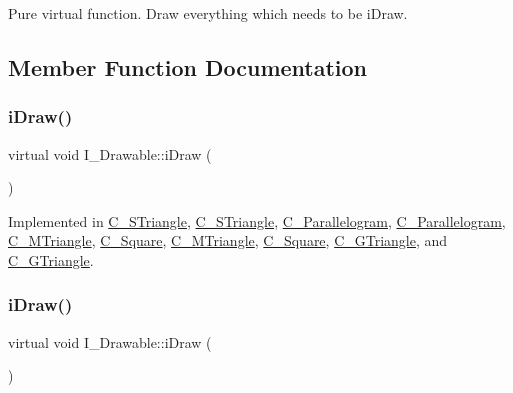 Pure virtual function. Draw everything which needs to be i\+Draw. 



\subsection{Member Function Documentation}
\mbox{\label{classI__Drawable_ae24c65000977a805f52ce032321cd86f}} 
\subsubsection{\texorpdfstring{i\+Draw()}{iDraw()}\hspace{0.1cm}{\footnotesize\ttfamily [1/4]}}
{\footnotesize\ttfamily virtual void I\+\_\+\+Drawable\+::i\+Draw (\begin{DoxyParamCaption}{ }\end{DoxyParamCaption})\hspace{0.3cm}{\ttfamily [pure virtual]}}



Implemented in \hyperlink{classC__STriangle_a7297480fe52b58654d81e2e70fbb237d}{C\+\_\+\+S\+Triangle}, \hyperlink{classC__STriangle_a7297480fe52b58654d81e2e70fbb237d}{C\+\_\+\+S\+Triangle}, \hyperlink{classC__Parallelogram_a6d43cc787a39def68c7b7de4a33caf5e}{C\+\_\+\+Parallelogram}, \hyperlink{classC__Parallelogram_a6d43cc787a39def68c7b7de4a33caf5e}{C\+\_\+\+Parallelogram}, \hyperlink{classC__MTriangle_ae75dd212f0b580664affc740945c8d0b}{C\+\_\+\+M\+Triangle}, \hyperlink{classC__Square_ae6c51a7720576bcbb94b52584552df28}{C\+\_\+\+Square}, \hyperlink{classC__MTriangle_ae75dd212f0b580664affc740945c8d0b}{C\+\_\+\+M\+Triangle}, \hyperlink{classC__Square_ae6c51a7720576bcbb94b52584552df28}{C\+\_\+\+Square}, \hyperlink{classC__GTriangle_a53abbd8cd622323fc2f3b80ce91cfde9}{C\+\_\+\+G\+Triangle}, and \hyperlink{classC__GTriangle_a53abbd8cd622323fc2f3b80ce91cfde9}{C\+\_\+\+G\+Triangle}.

\mbox{\label{classI__Drawable_ae24c65000977a805f52ce032321cd86f}} 
\subsubsection{\texorpdfstring{i\+Draw()}{iDraw()}\hspace{0.1cm}{\footnotesize\ttfamily [2/4]}}
{\footnotesize\ttfamily virtual void I\+\_\+\+Drawable\+::i\+Draw (\begin{DoxyParamCaption}{ }\end{DoxyParamCaption})\hspace{0.3cm}{\ttfamily [pure virtual]}}



